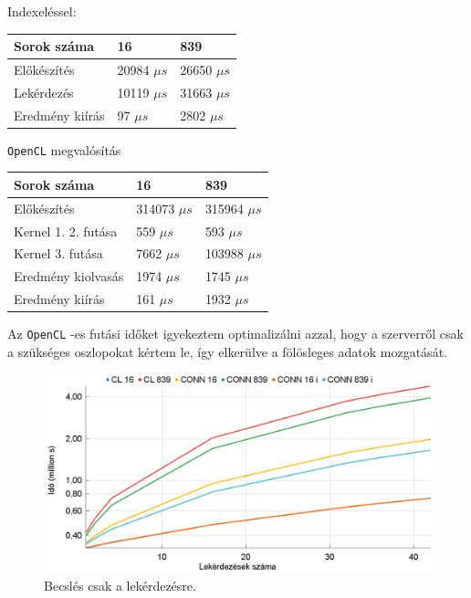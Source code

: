 \newpage

Indexeléssel:

\begin{table}[h!]
\centering
\begin{tabular}{|p{6cm}|p{3cm}|p{3cm}|}
\hline
Sorok száma & 16 & 839 \\
\hline
\hline

Előkészítés & 20984 $\mu s$ & 26650 $\mu s$ \\
\hline

Lekérdezés & 10119 $\mu s$ & 31663 $\mu s$ \\
\hline

Eredmény kiírás & 97 $\mu s$ & 2802 $\mu s$ \\
\hline

\end{tabular}
\end{table}

\texttt{OpenCL} megvalósítás

\begin{table}[h!]
\centering
\begin{tabular}{|p{6cm}|p{3cm}|p{3cm}|}
\hline
Sorok száma & 16 & 839 \\
\hline
\hline
Előkészítés & 314073 $\mu s$ & 315964 $\mu s$ \\
\hline
Kernel 1. 2. futása & 559 $\mu s$ & 593 $\mu s$ \\
\hline
Kernel 3. futása & 7662 $\mu s$ & 103988 $\mu s$ \\
\hline
Eredmény kiolvasás & 1974 $\mu s$ & 1745 $\mu s$ \\
\hline
Eredmény kiírás & 161 $\mu s$ & 1932 $\mu s$ \\
\hline
\end{tabular}
\end{table}	

Az \texttt{OpenCL} -es futási időket igyekeztem optimalizálni azzal, hogy a szerverről csak a szükséges oszlopokat kértem le, így elkerülve a fölösleges adatok mozgatását.

\begin{figure}[h!]
\centering
\includegraphics[width=\textwidth]{images/test/join2.png}
\caption{Becslés csak a lekérdezésre.}
\label{fig:join}
\end{figure}

